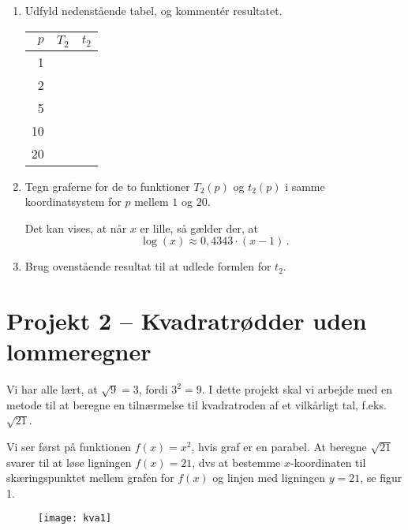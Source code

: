 \documentclass[12pt,oneside,a4paper]{article}
\theoremstyle{plain}
\begin{document}
\begin{enumerate}[label=(\alph*), resume]
    \item Udfyld nedenstående tabel, og kommentér resultatet.
        \begin{center}
            \begin{tabular}{|r|c|l|}
\hline
                $p$ & $T_2$ & $t_2$ \\
                \hline
                1 & & \\
                \hline
                2 & & \\
                \hline
                5 & & \\
                \hline
                10 & & \\
                \hline
                20 & & \\
                \hline
            \end{tabular}
        \end{center}

    \item Tegn graferne for de to funktioner $T_2(p)$ og $t_2(p)$ i samme
        koordinatsystem for $p$ mellem $1$ og $20$.

Det kan vises, at når $x$ er lille, så gælder der, at
        \[
            \log(x) \approx 0,4343 \cdot (x-1) \,.
        \]

    \item Brug ovenstående resultat til at udlede formlen for $t_2$.

\end{enumerate}


\section*{Projekt 2 -- Kvadratrødder uden lommeregner}
Vi har alle lært, at $\sqrt{9} = 3$, fordi $3^2 = 9$. I dette projekt skal vi
arbejde med en metode til at beregne en tilnærmelse til kvadratroden af et
vilkårligt tal, f.eks.
$\sqrt{21}$.

Vi ser først på funktionen $f(x) = x^2$, hvis graf er en parabel.
At beregne $\sqrt{21}$ svarer til at løse ligningen $f(x) = 21$, dvs at 
bestemme $x$-koordinaten til skæringspunktet mellem grafen for $f(x)$
og linjen med ligningen $y=21$, se figur 1.

\begin{figure}[ht]
    \centering
    \texttt{[image: kva1]}
    \caption{}
    \label{fig1}
\end{figure}
\end{document}

